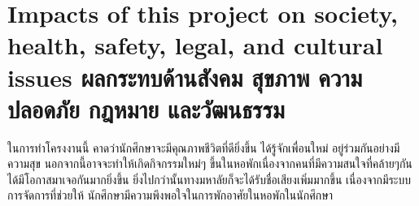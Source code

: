 
\section{\ifenglish%
Impacts of this project on society, health, safety, legal, and cultural issues
\else%
ผลกระทบด้านสังคม สุขภาพ ความปลอดภัย กฎหมาย และวัฒนธรรม
\fi}

ในการทำโครงงานนี้ คาดว่านักศึกษาจะมีคุณภาพชีวิตที่ดียิ่งขึ้น ได้รู้จักเพื่อนใหม่ อยู่ร่วมกันอย่างมีความสุข
นอกจากนี้อาจจะทำให้เกิดกิจกรรมใหม่ๆ ขึ้นในหอพักเนื่องจากคนที่มีความสนใจที่คล้ายๆกันได้มีโอกาสมาเจอกันมากยิ่งขึ้น
ยิ่งไปกว่านั้นทางมหาลัยก็จะได้รับชื่อเสียงเพิ่มมากขึ้น เนื่องจากมีระบบการจัดการที่ช่วยให้
นักศึกษามีความพึงพอใจในการพักอาศัยในหอพักในนักศึกษา 